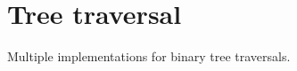 \chapter{Tree traversal }
\hypertarget{md_README}{}\label{md_README}
\label{md_README_autotoc_md0}%
%


Multiple implementations for binary tree traversals. 